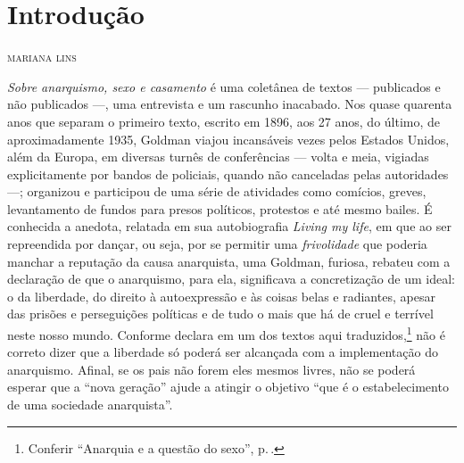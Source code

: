 \pagestyle{plain}

\newcommand{\subtitulo}[1]{\NoCaseChange{\textnormal{\break\Large\itshape#1}}}
\chapter*{Introdução\smallskip\subtitulo{A \textit{suma sacerdotisa} do anarquismo}}

\begin{flushright}
\textsc{mariana lins}
\end{flushright}\bigskip

\noindent\textit{Sobre anarquismo, sexo e casamento} é uma coletânea de
textos --- publicados e não publicados ---, uma entrevista e um rascunho
inacabado. Nos quase quarenta anos que separam o primeiro texto, escrito em 1896, aos 27 anos, do último, de
aproximadamente 1935, Goldman viajou incansáveis vezes pelos Estados
Unidos, além da Europa, em diversas turnês de conferências --- volta e
meia, vigiadas explicitamente por bandos de policiais, quando não
canceladas pelas autoridades ---; organizou e participou de uma série de
atividades como comícios, greves, levantamento de fundos para presos
políticos, protestos e até mesmo bailes. É conhecida a anedota, relatada
em sua autobiografia \textit{Living my life}, em que ao ser repreendida
por dançar, ou seja, por se permitir uma \textit{frivolidade} que poderia
manchar a reputação da causa anarquista, uma Goldman, furiosa, rebateu
com a declaração de que o anarquismo, para ela, significava a
concretização de um ideal: o da liberdade, do direito à
autoexpressão e às coisas belas e radiantes, apesar das prisões e
perseguições políticas e de tudo o mais que há de cruel e terrível neste
nosso mundo. Conforme declara em um dos textos aqui traduzidos,\footnote{Conferir ``Anarquia e a questão do sexo'', p.\,\pageref{ref1}.}
não é correto dizer que a
liberdade só poderá ser alcançada com a implementação do anarquismo.
Afinal, se os pais não forem eles mesmos livres, não se poderá esperar
que a ``nova geração'' ajude a atingir o objetivo ``que é o
estabelecimento de uma sociedade anarquista''.

